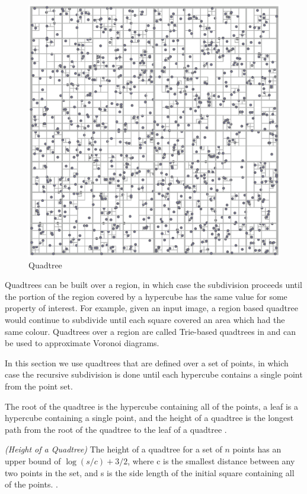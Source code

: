 \documentclass[mcs]{scsthesis}
\begin{document}
\begin{figure}
\begin{center}
\includegraphics[scale=0.35]{diagrams/quadtree.eps}
\caption{Quadtree}
\label{fig:quadtree}
\end{center}
\end{figure}

Quadtrees can be built over a region, in which case the subdivision proceeds
until the portion of the region covered by a hypercube has the same value for
some property of interest. For example, given an input image, a region based
quadtree would continue to subdivide until each square covered an area which
had the same colour. Quadtrees over a region are called Trie-based quadtrees in
\cite{samet} and can be used to approximate Voronoi diagrams.

In this section we use quadtrees that are defined over a set of points, in which
case the recursive subdivision is done until each hypercube contains a single
point from the point set.

The root of the quadtree is the hypercube containing all of the points, a leaf
is a hypercube containing a single point, and the height of a quadtree
is the longest path from the root of the quadtree to the leaf of a quadtree
\cite{dutch}.

\begin{thm} \emph{(Height of a Quadtree)}
The height of a quadtree for a set of $n$ points has an upper bound of \(\log(s/c)
+ 3/2\), where c is the smallest distance between any two points in the set, and
s is the side length of the initial square containing all of the points.
\cite{dutch}.
\end{thm}
\end{document}
